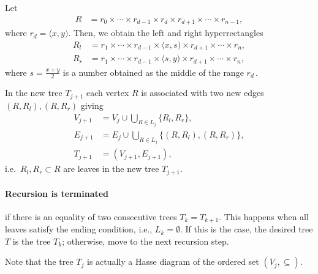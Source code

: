 Let
\begin{align*}
R &= r_0 \times  \cdots \times r_{d-1} \times  r_d\times r_{d+1} \times \cdots \times r_{n-1},
\end{align*}
where $r_d = \langle x, y )$.
Then, we obtain the left and right hyperrectangles
\begin{align*}
R_l &= r_1 \times  \cdots \times r_{d-1} \times  \langle x, s ) \times r_{d+1} \times \cdots \times r_n, \\
R_r &= r_1 \times  \cdots \times r_{d-1} \times \langle s, y ) \times r_{d+1} \times \cdots \times r_n,
\end{align*}
where 
\(s = \frac{x + y}{2}\)
is a number obtained as the middle of the range \(r_d\,\).

In the new tree $T_{j+1}$ each vertex \(R\) is associated with two new
edges \((R,R_l ), (R, R_r)\) giving
\begin{align*}
V_{j+1} &= V_j \cup \bigcup_{R \in L_j} \{R_l, R_r\},\\
E_{j+1} &= E_j \cup \bigcup_{R \in L_j} \{(R, R_l), (R,R_r)\},\\
T_{j+1} &= (V_{j+1}, E_{j+1}),
\end{align*}
i.e.~${R_l, R_r} \subset R$ are leaves in the new tree
\(T_{j+1}\).

\paragraph{Recursion is terminated} if there is an equality of two consecutive trees \(T_k = T_{k+1}\). This happens when all leaves satisfy the ending condition, i.e., \(L_k = \emptyset\).
If this is the case, the desired tree $T$ is the tree $T_k$; otherwise, move to the next recursion step.


Note that the tree \(T_{j}\) is actually a Hasse diagram of the ordered set
\((V_j,\subseteq)\).


